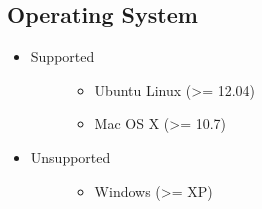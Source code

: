 \documentclass[letterpaper,10pt,english]{sphinxmanual}
\begin{document}
\subsection{Operating System}
\label{index:operating-system}\begin{itemize}
\item {} \begin{description}
\item[{Supported}] \leavevmode\begin{itemize}
\item {} 
Ubuntu Linux (\textgreater{}= 12.04)

\item {} 
Mac OS X (\textgreater{}= 10.7)

\end{itemize}

\end{description}

\item {} \begin{description}
\item[{Unsupported}] \leavevmode\begin{itemize}
\item {} 
Windows (\textgreater{}= XP)

\end{itemize}

\end{description}

\end{itemize}
\end{document}
